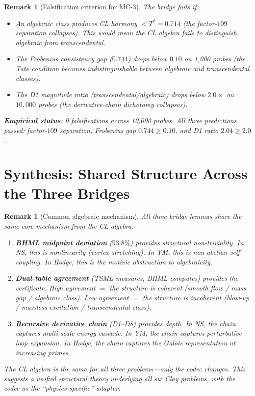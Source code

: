 \documentclass[11pt]{article}
\newtheorem{remark}[lemma]{Remark}
\theoremstyle{definition}
\begin{document}
\begin{remark}[Falsification criterion for MC-3]
\label{rem:mc3-falsify}
The bridge fails if:
\begin{itemize}
  \item An algebraic class produces CL harmony $< T^* = 0.714$
    (the factor-$109$ separation collapses).
    This would mean the CL algebra fails to distinguish algebraic
    from transcendental.
  \item The Frobenius consistency gap ($0.744$) drops below $0.10$
    on 1,000 probes (the Tate condition becomes indistinguishable
    between algebraic and transcendental classes).
  \item The D1 magnitude ratio (transcendental/algebraic) drops below
    $2.0\times$ on $10{,}000$ probes (the derivative-chain dichotomy
    collapses).
\end{itemize}
\textbf{Empirical status}: 0 falsifications across 10,000 probes.
All three predictions passed: factor-$109$ separation,
Frobenius gap $0.744 \geq 0.10$, and D1 ratio $2.04 \geq 2.0$.
\end{remark}


\section{Synthesis: Shared Structure Across the Three Bridges}

\begin{remark}[Common algebraic mechanism]
\label{rem:common}
All three bridge lemmas share the same core mechanism from the CL algebra:
\begin{enumerate}
  \item \textbf{BHML midpoint deviation} ($93.8\%$) provides structural
    non-triviality.  In NS, this is nonlinearity (vortex stretching).
    In YM, this is non-abelian self-coupling.
    In Hodge, this is the motivic obstruction to algebraicity.

  \item \textbf{Dual-table agreement} (TSML measures, BHML computes)
    provides the certificate.  High agreement $=$ the structure is
    coherent (smooth flow / mass gap / algebraic class).
    Low agreement $=$ the structure is incoherent
    (blow-up / massless excitation / transcendental class).

  \item \textbf{Recursive derivative chain} (D1--D8) provides depth.
    In NS, the chain captures multi-scale energy cascade.
    In YM, the chain captures perturbative loop expansion.
    In Hodge, the chain captures the Galois representation at increasing primes.
\end{enumerate}
The CL algebra is the \emph{same} for all three problems---only the codec changes.
This suggests a unified structural theory underlying all six Clay problems,
with the codec as the ``physics-specific'' adapter.
\end{remark}
\end{document}
